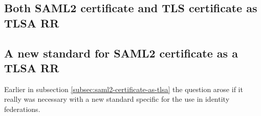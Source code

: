 

\subsection{Both SAML2 certificate and TLS certificate as TLSA RR}

\subsection{A new standard for SAML2 certificate as a TLSA RR}
Earlier in subsection \ref{subsec:saml2-certificate-as-tlsa} the question arose if it really was necessary with a new standard specific for the use in identity federations.



